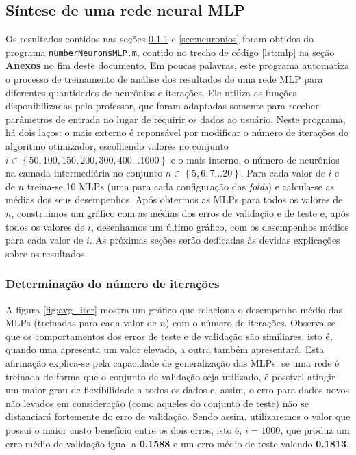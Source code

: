 \subsection{Síntese de uma rede neural MLP}
\label{sec:mlp}

Os resultados contidos nas seções \ref{sec:iteracoes} e \ref{sec:neuronios}
foram obtidos do programa \texttt{numberNeuronsMLP.m}, contido no trecho de
código \ref{lst:mlp} na seção \textbf{Anexos} no fim deste documento. Em poucas
palavras, este programa automatiza o processo de treinamento de análise dos
resultados de uma rede MLP para diferentes quantidades de neurônios e iterações.
Ele utiliza as funções disponibilizadas pelo professor, que foram adaptadas
somente para receber parâmetros de entrada no lugar de requirir os dados ao
usuário. Neste programa, há dois laços: o mais externo é reponsável por
modificar o número de iterações do algoritmo otimizador, escolhendo valores no
conjunto \(i \in \left\{ 50, 100, 150, 200, 300, 400 \dots 1000 \right\} \) e o
mais interno, o número de neurônios na camada intermediária no conjunto \( n \in
\left\{ 5, 6, 7 \dots 20 \right\} \). Para cada valor de \(i\) e de \(n\)
treina-se 10 MLPs (uma para cada configuração das \textit{folds}) e calcula-se
as médias dos seus desempenhos. Após obtermos as MLPs para todos os valores de \(n\), construimos
um gráfico com as médias dos erros de validação e de teste e, após todos os
valores de \(i\), desenhamos um último gráfico, com os desempenhos médios para
cada valor de \(i\). As próximas seções serão dedicadas às devidas explicações
sobre os resultados.

\subsubsection{Determinação do número de iterações}
\label{sec:iteracoes}

A figura \ref{fig:avg_iter} mostra um gráfico que relaciona o desempenho médio
das MLPs (treinadas para cada valor de \(n\)) com o número de iterações.
Observa-se que os comportamentos dos erros de teste e de validação são similiares, isto é, quando uma apresenta um valor
elevado, a outra também apresentará. Esta afirmação explica-se pela capacidade
de generalização das MLPs: se uma rede é treinada de forma que o conjunto de
validação seja utilizado, é possível atingir um maior grau de flexibilidade a
todos os dados e, assim, o erro para dados novos não levados em consideração
(como aqueles do conjunto de teste) não se distanciará fortemente do erro de
validação. Sendo assim, utilizaremos o valor que possui o maior custo benefício
entre os dois erros, isto é, \(i = 1000\), que produz um erro médio de validação
igual a \textbf{0.1588} e um erro médio de teste valendo \textbf{0.1813}.

